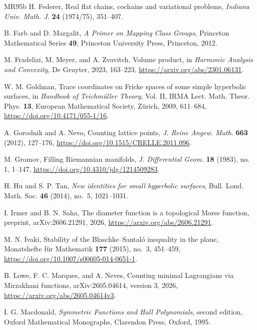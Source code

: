 \documentclass[10pt,twoside]{article}
\theoremstyle{plain}
\theoremstyle{definition}
\theoremstyle{remark}
\begin{document}
\begin{thebibliography}{MR95b}
H. Federer,
Real flat chains, cochains and variational problems,
\emph{Indiana Univ. Math. J.} \textbf{24} (1974/75), 351--407.

B. Farb and D. Margalit,
\emph{A Primer on Mapping Class Groups},
Princeton Mathematical Series \textbf{49}, Princeton University Press,
Princeton, 2012.

M. Fradelizi, M. Meyer, and A. Zvavitch,
Volume product,
in \emph{Harmonic Analysis and Convexity},
De Gruyter, 2023, 163--223,
\url{https://arxiv.org/abs/2301.06131}.


W. M. Goldman,
Trace coordinates on Fricke spaces of some simple hyperbolic surfaces,
in \emph{Handbook of Teichm\"uller Theory}, Vol. II,
IRMA Lect. Math. Theor. Phys. \textbf{13}, European Mathematical Society,
Z\"urich, 2009, 611--684,
\url{https://doi.org/10.4171/055-1/16}.

A. Gorodnik and A. Nevo,
Counting lattice points,
\emph{J. Reine Angew. Math.} \textbf{663} (2012), 127--176,
\url{https://doi.org/10.1515/CRELLE.2011.096}.

M. Gromov,
Filling Riemannian manifolds,
\emph{J. Differential Geom.} \textbf{18} (1983), no. 1, 1--147,
\url{https://doi.org/10.4310/jdg/1214509283}.

H. Hu and S. P. Tan,
\emph{New identities for small hyperbolic surfaces},
Bull. Lond. Math. Soc. \textbf{46} (2014), no.~5, 1021--1031.

I. Irmer and B. N. Saha,
The diameter function is a topological Morse function,
preprint, arXiv:2606.21291, 2026,
\url{https://arxiv.org/abs/2606.21291}.

M. N. Ivaki,
Stability of the Blaschke--Santal\'o inequality in the plane,
Monatshefte f\"ur Mathematik
\textbf{177} (2015), no.~3, 451--459,
\url{https://doi.org/10.1007/s00605-014-0651-1}.

B. Lowe, F. C. Marques, and A. Neves,
Counting minimal Lagrangians via Mirzakhani functions,
arXiv:2605.04614, version 3, 2026,
\url{https://arxiv.org/abs/2605.04614v3}.

I. G. Macdonald,
\emph{Symmetric Functions and Hall Polynomials}, second edition,
Oxford Mathematical Monographs, Clarendon Press, Oxford, 1995.


\end{thebibliography}
\end{document}
